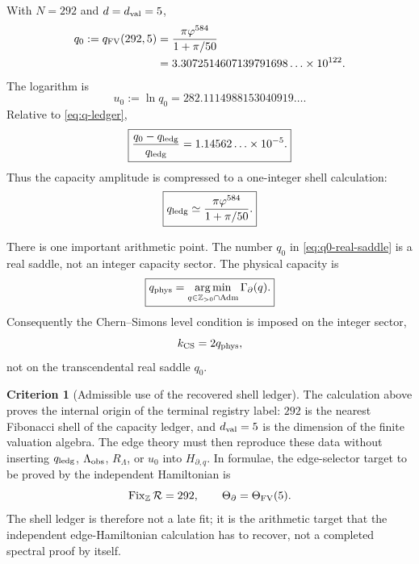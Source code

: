\documentclass[aps,prd,reprint,nofootinbib,superscriptaddress,floatfix]{revtex4-2}
\numberwithin{equation}{section}
\theoremstyle{definition}
\newtheorem{criterion}{Criterion}[section]
\theoremstyle{plain}
\begin{document}
With \(N=292\) and \(d=d_{\rm val}=5\),
\begin{equation}
\begin{aligned}
q_0:=q_{\rm FV}(292,5)
&=
\frac{\pi\varphi^{584}}{1+\pi/50}
\\
&=
3.3072514607139791698\ldots\times10^{122}.
\end{aligned}
\label{eq:q0-real-saddle}
\end{equation}
The logarithm is
\begin{equation}
\boxed{
u_0:=\ln q_0
=
282.1114988153040919\ldots .
}
\label{eq:u0-real-saddle}
\end{equation}
Relative to \eqref{eq:q-ledger},
\begin{equation}
\boxed{
\frac{q_0-q_{\rm ledg}}{q_{\rm ledg}}
=
1.14562\ldots\times10^{-5}.
}
\label{eq:qFV-residual}
\end{equation}
Thus the capacity amplitude is compressed to a one-integer shell calculation:
\begin{equation}
\boxed{
q_{\rm ledg}
\simeq
\frac{\pi\varphi^{584}}{1+\pi/50}.
}
\end{equation}

There is one important arithmetic point.  The number \(q_0\) in \eqref{eq:q0-real-saddle} is a real saddle, not an integer capacity sector.  The physical capacity is
\begin{equation}
\boxed{
q_{\rm phys}
=
\operatorname*{arg\,min}_{q\in\mathbb Z_{>0}\cap{\rm Adm}}
\Gamma_\partial(q).
}
\label{eq:qphys-integer-projection}
\end{equation}
Consequently the Chern--Simons level condition is imposed on the integer sector,
\[
k_{\rm CS}=2q_{\rm phys},
\]
not on the transcendental real saddle \(q_0\).

\begin{criterion}[Admissible use of the recovered shell ledger]
The calculation above proves the internal origin of the terminal registry label: \(292\) is the nearest Fibonacci shell of the capacity ledger, and \(d_{\rm val}=5\) is the dimension of the finite valuation algebra.  The edge theory must then reproduce these data without inserting \(q_{\rm ledg}\), \(\Lambda_{\rm obs}\), \(R_\Lambda\), or \(u_0\) into \(H_{\partial,q}\).  In formulae, the edge-selector target to be proved by the independent Hamiltonian is
\[
\operatorname{Fix}_{\mathbb Z}\mathcal R=292,
\qquad
\Theta_\partial=\Theta_{\rm FV}(5).
\]
The shell ledger is therefore not a late fit; it is the arithmetic target that the independent edge-Hamiltonian calculation has to recover, not a completed spectral proof by itself.
\end{criterion}
\end{document}

